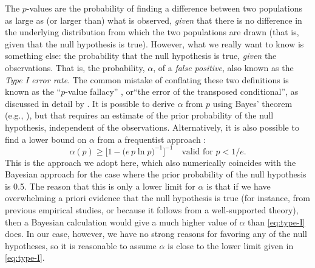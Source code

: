 

The \(p\)-values are the probability of finding a difference between
two populations as large as (or larger than) what is observed,
\emph{given} that there is no difference in the underlying
distribution from which the two populations are drawn (that is, given
that the null hypothesis is true).  However, what we really want to
know is something else: the probability that the null hypothesis is
true, \emph{given} the observations.  That is, the probability,
\(\alpha\), of a \textit{false positive}, also known as the \textit{Type I
  error rate}.  The common mistake of conflating these two definitions
is known as the ``\(p\)-value fallacy'' \citep{Goodman:1999a}, or``the
error of the transposed conditional'', as discussed in detail by
\citet{Colquhoun:2014a}.  It is possible to derive \(\alpha\) from
\(p\) using Bayes' theorem (e.g., \citealp{Goodman:1999b}), but that
requires an estimate of the prior probability of the null hypothesis,
independent of the observations.  Alternatively, it is also possible
to find a lower bound on \(\alpha\) from a frequentist approach
\citep{Sellke:2001a}:
\begin{equation}
  \label{eq:type-I}
  \alpha(p) \ge \bigg[ 1 - \big(e\, p \ln p\big)^{-1} \bigg]^{-1}
  \quad \text{valid for } p < 1/e.
\end{equation}
This is the approach we adopt here, which also numerically coincides
with the Bayesian approach for the case where the prior probability of
the null hypothesis is 0.5.  The reason that this is only a lower
limit for \(\alpha\) is that if we have overwhelming a priori evidence that
the null hypothesis is true (for instance, from previous empirical
studies, or because it follows from a well-supported theory), then a
Bayesian calculation would give a much higher value of \(\alpha\) than
\eqref{eq:type-I} does.  In our case, however, we have no strong
reasons for favoring any of the null hypotheses, so it is reasonable
to assume \(\alpha\) is close to the lower limit given in \eqref{eq:type-I}.

